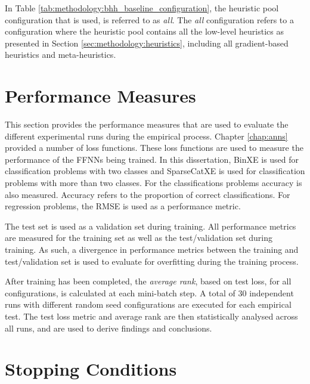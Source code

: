 In Table \ref{tab:methodology:bhh_baseline_configuration}, the heuristic pool configuration that is used, is referred to as \textit{all}. The \textit{all} configuration refers to a configuration where the heuristic pool contains all the low-level heuristics as presented in Section \ref{sec:methodology:heuristics}, including all gradient-based heuristics and meta-heuristics.


\section{Performance Measures}\label{sec:methodology:performance_measures}

This section provides the performance measures that are used to evaluate the different experimental runs during the empirical process. Chapter \ref{chap:anns} provided a number of loss functions. These loss functions are used to measure the performance of the \acp{FFNN} being trained. In this dissertation, \acf{BinXE} is used for classification problems with two classes and \acf{SparseCatXE} is used for classification problems with more than two classes. For the classifications problems accuracy is also measured. Accuracy refers to the proportion of correct classifications. For regression problems, the \acf{RMSE} is used as a performance metric.

The test set is used as a validation set during training. All performance metrics are measured for the training set as well as the test/validation set during training. As such, a divergence in performance metrics between the training and test/validation set is used to evaluate for overfitting during the training process.

After training has been completed, the \textit{average rank}, based on test loss, for all configurations, is calculated at each mini-batch step. A total of 30 independent runs with different random seed configurations are executed for each empirical test. The test loss metric and average rank are then statistically analysed across all runs, and are used to derive findings and conclusions.

\section{Stopping Conditions}\label{sec:methodology:stopping_conditions}

